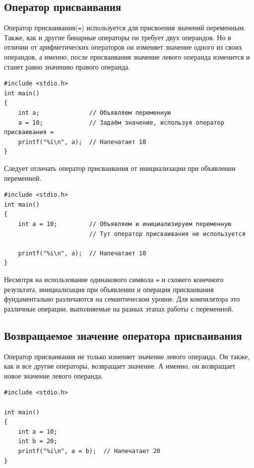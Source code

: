\documentclass[10pt]{article}
\begin{document}
\subsection*{Оператор присваивания}
Оператор присваивания(\texttt{=}) используется для присвоения значений переменным. Также, как и другие бинарные операторы он требует двух операндов. Но в отличии от арифметических операторов он изменяет значение одного из своих операндов, а именно, после присваивания значение левого операнда изменится и станет равно значению правого операнда.
\begin{lstlisting}
#include <stdio.h>
int main()
{
	int a;				// Объявляем переменную
	a = 10;             // Задаём значение, используя оператор присваивания =
	printf("%i\n", a);  // Напечатает 10
}
\end{lstlisting}

\noindent Следует отличать оператор присваивания от инициализации при объявлении переменной. 
\begin{lstlisting}
#include <stdio.h>
int main()
{
	int a = 10;			// Объявляем и инициализируем переменную
		    			// Тут оператор присваивания не используется
	
	printf("%i\n", a);  // Напечатает 10
}
\end{lstlisting}
Несмотря на использование одинакового символа \texttt{=} и схожего конечного результата, инициализация при объявлении и операция присваивания фундаментально различаются на семантическом уровне. Для компилятора это различные операции, выполняемые на разных этапах работы с переменной.

\subsection*{Возвращаемое значение оператора присваивания}
Оператор присваивания не только изменяет значение левого операнда. Он также, как и все другие операторы, возвращает значение. А именно, он возвращает новое значение левого операнда.
\begin{lstlisting}
#include <stdio.h>

int main()
{
    int a = 10;
    int b = 20;
    printf("%i\n", a = b);  // Напечатает 20
}
\end{lstlisting}
\end{document}
